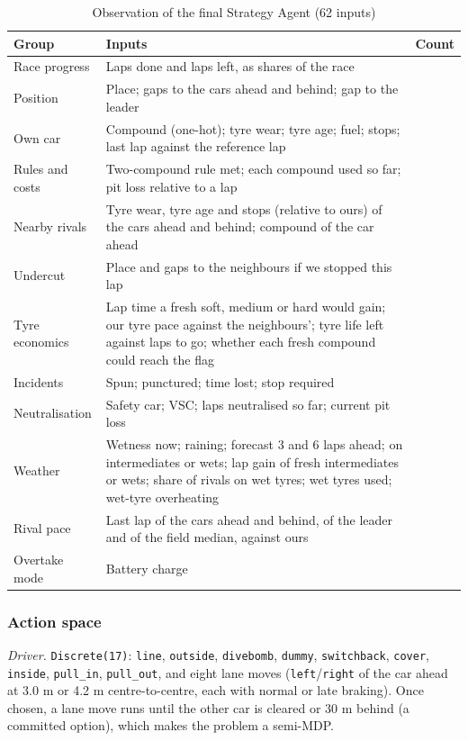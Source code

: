 \documentclass{ieeeaccess}
\begin{document}
\begin{table}[!t]
\caption{Observation of the final Strategy Agent (62 inputs)}
\label{tab:3}
\centering\footnotesize
\begin{tabularx}{\columnwidth}{>{\raggedright\arraybackslash}X>{\raggedright\arraybackslash}X>{\raggedright\arraybackslash}X}
\hline
\textbf{Group} & \textbf{Inputs} & \textbf{Count} \\
\hline
Race progress & Laps done and laps left, as shares of the race & 2 \\
Position & Place; gaps to the cars ahead and behind; gap to the leader & 4 \\
Own car & Compound (one-hot); tyre wear; tyre age; fuel; stops; last lap against the reference lap & 8 \\
Rules and costs & Two-compound rule met; each compound used so far; pit loss relative to a lap & 5 \\
Nearby rivals & Tyre wear, tyre age and stops (relative to ours) of the cars ahead and behind; compound of the car ahead & 7 \\
Undercut & Place and gaps to the neighbours if we stopped this lap & 3 \\
Tyre economics & Lap time a fresh soft, medium or hard would gain; our tyre pace against the neighbours'; tyre life left against laps to go; whether each fresh compound could reach the flag & 9 \\
Incidents & Spun; punctured; time lost; stop required & 4 \\
Neutralisation & Safety car; VSC; laps neutralised so far; current pit loss & 4 \\
Weather & Wetness now; raining; forecast 3 and 6 laps ahead; on intermediates or wets; lap gain of fresh intermediates or wets; share of rivals on wet tyres; wet tyres used; wet-tyre overheating & 11 \\
Rival pace & Last lap of the cars ahead and behind, of the leader and of the field median, against ours & 4 \\
Overtake mode & Battery charge & 1 \\
\hline
\end{tabularx}
\end{table}

\subsubsection{Action space}

\emph{Driver.} \texttt{Discrete(17)}: \texttt{line}, \texttt{outside}, \texttt{divebomb}, \texttt{dummy}, \texttt{switchback},
\texttt{cover}, \texttt{inside}, \texttt{pull\_in}, \texttt{pull\_out}, and eight lane moves (\texttt{left}/\texttt{right} of
the car ahead at 3.0 m or 4.2 m centre-to-centre, each with normal or late
braking). Once chosen, a lane move runs until the other car is cleared or 30 m
behind (a committed option), which makes the problem a semi-MDP.
\end{document}

